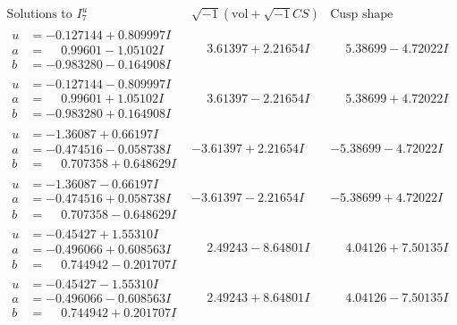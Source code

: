 \documentclass[1p]{elsarticle_modified}
\theoremstyle{definition}
\newcommand{\I}{\sqrt{-1}}
\begin{document}
$$\begin{array}{c|c|c}  
\text{Solutions to }I^u_{7}& \I (\text{vol} + \sqrt{-1}CS) & \text{Cusp shape}\\
 \hline 
\begin{aligned}
u &= -0.127144 + 0.809997 I \\
a &= \phantom{-}0.99601 - 1.05102 I \\
b &= -0.983280 - 0.164908 I\end{aligned}
 & \phantom{-}3.61397 + 2.21654 I & \phantom{-}5.38699 - 4.72022 I \\ \hline\begin{aligned}
u &= -0.127144 - 0.809997 I \\
a &= \phantom{-}0.99601 + 1.05102 I \\
b &= -0.983280 + 0.164908 I\end{aligned}
 & \phantom{-}3.61397 - 2.21654 I & \phantom{-}5.38699 + 4.72022 I \\ \hline\begin{aligned}
u &= -1.36087 + 0.66197 I \\
a &= -0.474516 - 0.058738 I \\
b &= \phantom{-}0.707358 + 0.648629 I\end{aligned}
 & -3.61397 + 2.21654 I & -5.38699 - 4.72022 I \\ \hline\begin{aligned}
u &= -1.36087 - 0.66197 I \\
a &= -0.474516 + 0.058738 I \\
b &= \phantom{-}0.707358 - 0.648629 I\end{aligned}
 & -3.61397 - 2.21654 I & -5.38699 + 4.72022 I \\ \hline\begin{aligned}
u &= -0.45427 + 1.55310 I \\
a &= -0.496066 + 0.608563 I \\
b &= \phantom{-}0.744942 - 0.201707 I\end{aligned}
 & \phantom{-}2.49243 - 8.64801 I & \phantom{-}4.04126 + 7.50135 I \\ \hline\begin{aligned}
u &= -0.45427 - 1.55310 I \\
a &= -0.496066 - 0.608563 I \\
b &= \phantom{-}0.744942 + 0.201707 I\end{aligned}
 & \phantom{-}2.49243 + 8.64801 I & \phantom{-}4.04126 - 7.50135 I \\ \hline\begin{aligned}

\end{aligned}
\end{array}$$
\end{document}
